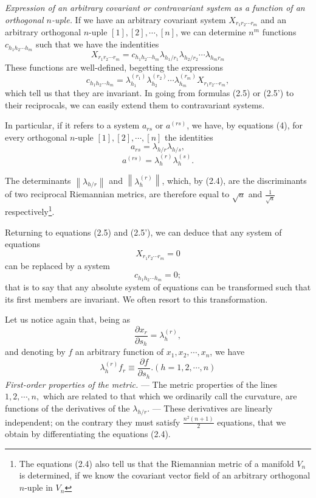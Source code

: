 \documentclass{book}
\begin{document}
\emph{Expression of an arbitrary covariant or contravariant system as a function of an orthogonal $n$-uple.} If we have an arbitrary covariant system $X_{r_1r_2\cdots r_m}$ and an arbitrary orthogonal $n$-uple $[1],[2],\cdots,[n]$, we can determine $n^m$ functions $c_{h_1h_2\cdots h_m}$ such that we have the indentities
\begin{equation}
X_{r_1r_2\cdots r_m}=c_{h_1h_2\cdots h_m}\lambda_{h_1/r_1}\lambda_{h_2/r_2}\cdots\lambda_{h_mr_m}
\end{equation}
These functions are well-defined, begetting the expressions
\begin{equation*}
\tag{2.5'}
c_{h_1h_2\cdots h_m}=\lambda^{(r_1)}_{h_1}\lambda^{(r_2)}_{h_2}\cdots \lambda^{(r_m)}_{h_m}X_{r_1r_2\cdots r_m},
\end{equation*}
which tell us that they are invariant. In going from formulas (2.5) or (2.5') to their reciprocals, we can easily extend them to contravariant systems. 

In particular, if it refers to a system $a_{rs}$ or $a^{(rs)}$, we have, by equations (4), for every orthogonal $n$-uple $[1],[2],\cdots,[n]$ the identities
\begin{equation*}
\tag{2.4'}
a_{rs}=\lambda_{h/r}\lambda_{h/s},
\end{equation*}
\begin{equation*}
\tag{2.4''}
a^{(rs)}=\lambda^{(r)}_h\lambda^{(s)}_h.
\end{equation*}

The determinants $\left\|\lambda_{h/r}\right\|$ and $\left\|\lambda^{(r)}_h\right\|$, which, by (2.4), are the discriminants of two reciprocal Riemannian metrics, are therefore equal to $\sqrt{a}$ and $\frac{1}{\sqrt{a}}$ respectively\footnote{The equations (2.4) also tell us that the Riemannian metric of a manifold $V_n$ is determined, if we know the covariant vector field of an arbitrary orthogonal $n$-uple in $V_n$}.

Returning to equations (2.5) and (2.5'), we can deduce that any system of equations
$$X_{r_1r_2\cdots r_m}=0$$
can be replaced by a system
$$c_{h_1h_2\cdots h_m}=0;$$
that is to say that any absolute system of equations can be transformed such that its first members are invariant. We often resort to this transformation. 

Let us notice again that, being as 
$$\frac{\partial x_r}{\partial s_h}=\lambda^{(r)}_h,$$
and denoting by $f$ an arbitrary function of $x_1,x_2,\cdots,x_n$, we have
\begin{equation}
\lambda^{(r)}_hf_r\equiv \frac{\partial f}{\partial s_h}. (h=1,2,\cdots,n)
\end{equation}
\emph{First-order properties of the metric.} --- The metric properties of the lines $1,2,\cdots,n,$ which are related to that which we ordinarily call the curvature, are functions of the derivatives of the $\lambda_{h/r}$. --- These derivatives are linearly independent; on the contrary they must satisfy $\frac{n^2(n+1)}{2}$ equations, that we obtain by differentiating the equations (2.4).
\end{document}
